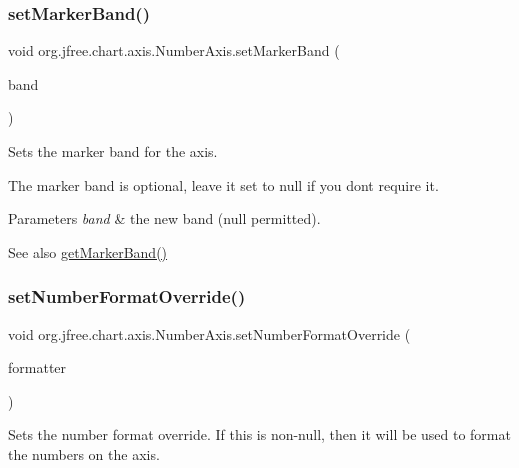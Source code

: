 \subsubsection{\texorpdfstring{set\+Marker\+Band()}{setMarkerBand()}}
{\footnotesize\ttfamily void org.\+jfree.\+chart.\+axis.\+Number\+Axis.\+set\+Marker\+Band (\begin{DoxyParamCaption}\item[{\mbox{\hyperlink{classorg_1_1jfree_1_1chart_1_1axis_1_1_marker_axis_band}{Marker\+Axis\+Band}}}]{band }\end{DoxyParamCaption})}

Sets the marker band for the axis. 

The marker band is optional, leave it set to {\ttfamily null} if you don\textquotesingle{}t require it.


\begin{DoxyParams}{Parameters}
{\em band} & the new band ({\ttfamily null} permitted).\\
\hline
\end{DoxyParams}
\begin{DoxySeeAlso}{See also}
\mbox{\hyperlink{classorg_1_1jfree_1_1chart_1_1axis_1_1_number_axis_a5a439c05a6192b3760772f680d307bd9}{get\+Marker\+Band()}} 
\end{DoxySeeAlso}
\mbox{\label{classorg_1_1jfree_1_1chart_1_1axis_1_1_number_axis_aa30f98a9e8ab585366f8cbe3bf4f6edf}} 
\subsubsection{\texorpdfstring{set\+Number\+Format\+Override()}{setNumberFormatOverride()}}
{\footnotesize\ttfamily void org.\+jfree.\+chart.\+axis.\+Number\+Axis.\+set\+Number\+Format\+Override (\begin{DoxyParamCaption}\item[{Number\+Format}]{formatter }\end{DoxyParamCaption})}

Sets the number format override. If this is non-\/null, then it will be used to format the numbers on the axis.


